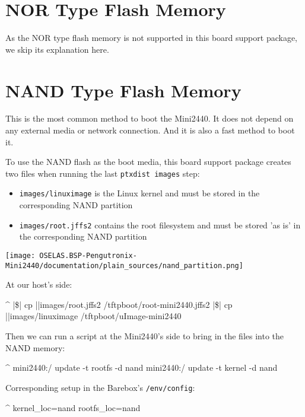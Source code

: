 \section{NOR Type Flash Memory}

As the NOR type flash memory is not supported in this board support package,
we skip its explanation here.

\section{NAND Type Flash Memory}				\label{sec:nandflashmem}

This is the most common method to boot the Mini2440. It does not depend on
any external media or network connection. And it is also a fast method to
boot it.

To use the NAND flash as the boot media, this board support package creates
two files when running the last \texttt{ptxdist images} step:

\begin{itemize}
\item \texttt{\ptxdistPlatformDir images/linuximage} is the Linux kernel
	and must be stored in the corresponding NAND partition
\item \texttt{\ptxdistPlatformDir images/root.jffs2} contains the root filesystem
	and must be stored 'as is' in the corresponding NAND partition
\end{itemize}

\centerline{\texttt{[image: OSELAS.BSP-Pengutronix-Mini2440/documentation/plain\_sources/nand\_partition.png]}}

At our host's side:

\begin{ptxshell}[escapechar=|]{^}
|\$| cp |\ptxdistPlatformDir |images/root.jffs2 /tftpboot/root-mini2440.jffs2
|\$| cp |\ptxdistPlatformDir |images/linuximage /tftpboot/uImage-mini2440
\end{ptxshell}

Then we can run a script at the Mini2440's side to bring in the files into the
NAND memory:

\begin{ptxshell}[escapechar=|]{^}
mini2440:/ update -t rootfs -d nand
mini2440:/ update -t kernel -d nand
\end{ptxshell}

Corresponding setup in the Barebox's \texttt{/env/config}:

\begin{ptxshell}[escapechar=|]{^}
kernel_loc=nand
rootfs_loc=nand
\end{ptxshell}

